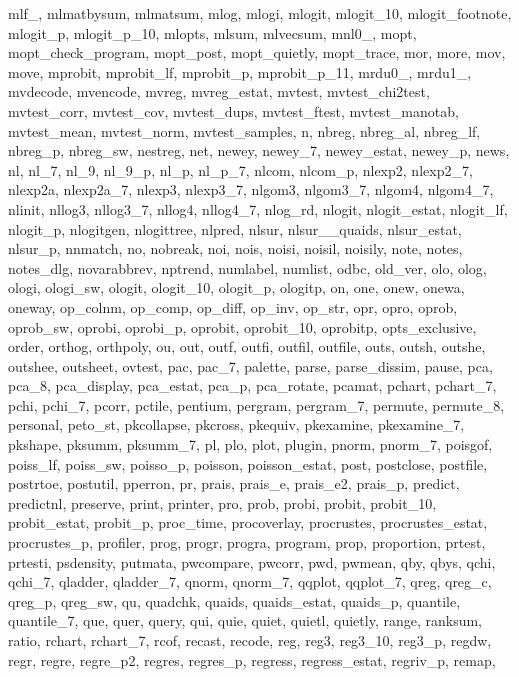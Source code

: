 {{    mlf_, mlmatbysum, mlmatsum, mlog, mlogi, mlogit, mlogit_10, mlogit_footnote, mlogit_p, mlogit_p_10, mlopts, mlsum, mlvecsum, mnl0_, mopt, mopt_check_program, mopt_post, mopt_quietly, mopt_trace, mor, more, mov, move,
    mprobit, mprobit_lf, mprobit_p, mprobit_p_11, mrdu0_, mrdu1_, mvdecode, mvencode, mvreg, mvreg_estat, mvtest, mvtest_chi2test, mvtest_corr, mvtest_cov, mvtest_dups, mvtest_ftest, mvtest_manotab, mvtest_mean,
    mvtest_norm, mvtest_samples, n, nbreg, nbreg_al, nbreg_lf, nbreg_p, nbreg_sw, nestreg, net, newey, newey_7, newey_estat, newey_p, news, nl, nl_7, nl_9, nl_9_p, nl_p, nl_p_7, nlcom, nlcom_p, nlexp2, nlexp2_7, nlexp2a,
    nlexp2a_7, nlexp3, nlexp3_7, nlgom3, nlgom3_7, nlgom4, nlgom4_7, nlinit, nllog3, nllog3_7, nllog4, nllog4_7, nlog_rd, nlogit, nlogit_estat, nlogit_lf, nlogit_p, nlogitgen, nlogittree, nlpred, nlsur, nlsur__quaids,
    nlsur_estat, nlsur_p, nnmatch, no, nobreak, noi, nois, noisi, noisil, noisily, note, notes, notes_dlg, novarabbrev, nptrend, numlabel, numlist, odbc, old_ver, olo, olog, ologi, ologi_sw, ologit, ologit_10, ologit_p,
    ologitp, on, one, onew, onewa, oneway, op_colnm, op_comp, op_diff, op_inv, op_str, opr, opro, oprob, oprob_sw, oprobi, oprobi_p, oprobit, oprobit_10, oprobitp, opts_exclusive, order, orthog, orthpoly, ou, out, outf,
    outfi, outfil, outfile, outs, outsh, outshe, outshee, outsheet, ovtest, pac, pac_7, palette, parse, parse_dissim, pause, pca, pca_8, pca_display, pca_estat, pca_p, pca_rotate, pcamat, pchart, pchart_7, pchi, pchi_7,
    pcorr, pctile, pentium, pergram, pergram_7, permute, permute_8, personal, peto_st, pkcollapse, pkcross, pkequiv, pkexamine, pkexamine_7, pkshape, pksumm, pksumm_7, pl, plo, plot, plugin, pnorm, pnorm_7, poisgof,
    poiss_lf, poiss_sw, poisso_p, poisson, poisson_estat, post, postclose, postfile, postrtoe, postutil, pperron, pr, prais, prais_e, prais_e2, prais_p, predict, predictnl, preserve, print, printer, pro, prob, probi,
    probit, probit_10, probit_estat, probit_p, proc_time, procoverlay, procrustes, procrustes_estat, procrustes_p, profiler, prog, progr, progra, program, prop, proportion, prtest, prtesti, psdensity, putmata, pwcompare,
    pwcorr, pwd, pwmean, qby, qbys, qchi, qchi_7, qladder, qladder_7, qnorm, qnorm_7, qqplot, qqplot_7, qreg, qreg_c, qreg_p, qreg_sw, qu, quadchk, quaids, quaids_estat, quaids_p, quantile, quantile_7, que, quer, query,
    qui, quie, quiet, quietl, quietly, range, ranksum, ratio, rchart, rchart_7, rcof, recast, recode, reg, reg3, reg3_10, reg3_p, regdw, regr, regre, regre_p2, regres, regres_p, regress, regress_estat, regriv_p, remap,
}}
